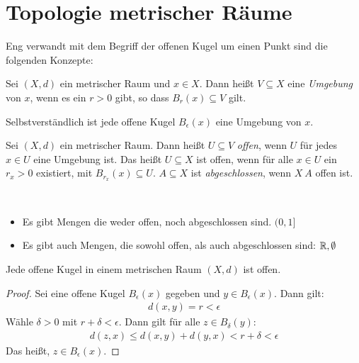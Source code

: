 \section{Topologie metrischer Räume}
Eng verwandt mit dem Begriff der offenen Kugel um einen Punkt sind die folgenden 
Konzepte:

\begin{Definition}{%
	Sei $(X,d)$ ein metrischer Raum und $x \in X$. Dann heißt $V \subseteq X$ eine 
	\emph{Umgebung} von $x$, wenn es ein $r > 0$ gibt, so dass $B_r(x) \subseteq V$ 
	gilt.
}\end{Definition}

\begin{Beispiel}
	Selbstverständlich ist jede offene Kugel $B_\epsilon(x)$ eine Umgebung von $x$.
\end{Beispiel}

\begin{Definition}{%
	Sei $(X,d)$ ein metrischer Raum. Dann heißt $U \subseteq V$ \emph{offen}, wenn 
	$U$ für jedes $x \in U$ eine Umgebung ist.
	Das heißt $U \subseteq X$ ist offen, wenn für alle $x \in U$ ein $r_x > 0$ 
	existiert, mit $B_{r_x}(x) \subseteq U$. 
	$A \subseteq X$ ist \emph{abgeschlossen}, wenn $X \ A$ offen ist. 
}\end{Definition}

\begin{Bemerkung}~
	\begin{itemize}
		\item Es gibt Mengen die weder offen, noch abgeschlossen sind. $(0,1]$
		\item Es gibt auch Mengen, die sowohl offen, als auch abgeschlossen sind:
		$\mathbb{R}, \emptyset$
	\end{itemize}
\end{Bemerkung}

\begin{Lemma}{%
	Jede offene Kugel in einem metrischen Raum $(X,d)$ ist offen.
}\end{Lemma}

\begin{proof}
	Sei eine offene Kugel $B_\epsilon(x)$ gegeben und $y \in B_\epsilon(x)$. 
	Dann gilt:
	\begin{align*}
		d(x,y) = r < \epsilon
	\end{align*}
	Wähle $\delta > 0$ mit $r + \delta < \epsilon$. Dann gilt für alle 
	$z \in B_\delta (y)$:
	\begin{align*}
		d(z,x) \leq d(x,y) + d(y,x) < r + \delta < \epsilon
	\end{align*}
	Das heißt, $z \in B_\epsilon(x)$.
\end{proof}
